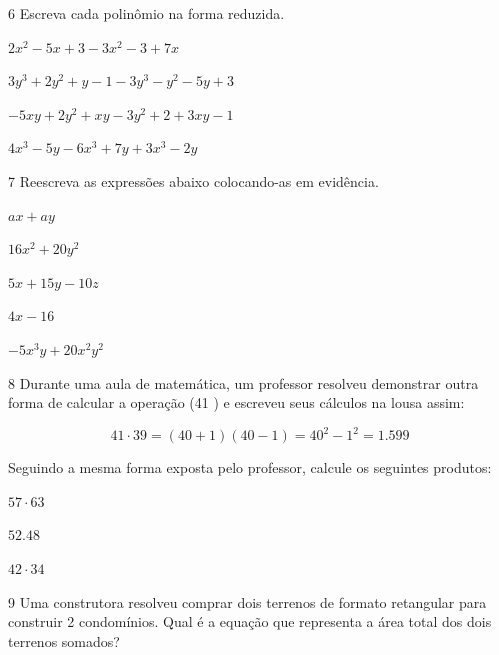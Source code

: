\num{6} Escreva cada polinômio na forma reduzida.

\begin{escolha}
\item $2x^2 - 5x + 3 - 3x^2 - 3 + 7x$
\item $3y^3 + 2y^2 + y - 1 - 3y^3 - y^2 - 5y +3$
\item $-5xy + 2y^2 + xy - 3y^2 + 2 + 3xy - 1$
\item $4x^3 - 5y - 6x^3 + 7y + 3x^3 - 2y$
\end{escolha}


\num{7} Reescreva as expressões abaixo colocando-as em evidência.

\begin{escolha}
\item $ax + ay$
\item $16x^2 + 20y^2$
\item $5x + 15y - 10z$
\item $4x - 16$
\item $-5x^3y + 20x^2y^2$
\end{escolha}

\num{8} Durante uma aula de matemática, um professor resolveu demonstrar
outra forma de calcular a operação (41 ) e escreveu seus cálculos na
lousa assim:

$$41 \cdot 39 = (40 + 1) (40 - 1) = 40^2 - 1^2 = 1.599$$

Seguindo a mesma forma exposta pelo professor, calcule os seguintes
produtos:

\begin{escolha}
\item $57 \cdot 63$
\item $52. 48$
\item $42 \cdot 34$
\end{escolha}

\pagebreak

\num{9} Uma construtora resolveu comprar dois terrenos de formato retangular
para construir 2 condomínios. Qual é a equação que representa a área
total dos dois terrenos somados?

